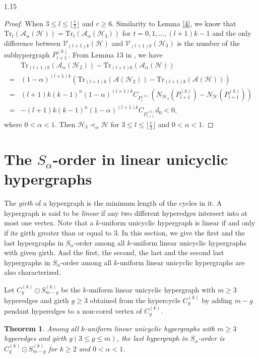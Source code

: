 \documentclass[preprint,12pt]{elsarticle1}
\newtheorem{thm}{Theorem}[section]
\numberwithin{equation}{section}
\begin{document}
\begin{spacing}{1.15}
\begin{proof}
When $3\le l\le \lfloor\frac{r}{2}\rfloor$ and $r\ge6$.
Similarity to Lemma \ref{4}, we know that $\mathrm{Tr}_t(\mathcal{A}_{\alpha}(\mathcal{H}))=\mathrm{Tr}_t(\mathcal{A}_{\alpha}(\mathcal{H}_3))$ for $t=0,1,\ldots,(l+1)k-1$ and the only difference between $\mathcal{V}_{(l+1)k}(\mathcal{H})$ and $\mathcal{V}_{(l+1)k}(\mathcal{H}_3)$ is the number of the subhypergraph $P_{l+1}^{(k)}$.
From Lemma 13 in \cite{ref10}, we have
\begin{align*}
&\mathrm{Tr}_{(l+1)k}(\mathcal{A}_{\alpha}(\mathcal{H}_2))-\mathrm{Tr}_{(l+1)k}(\mathcal{A}_{\alpha}(\mathcal{H}))\\
=&(1-\alpha)^{(l+1)k}\left(\mathrm{Tr}_{(l+1)k}(\mathcal{A}(\mathcal{H}_2))-\mathrm{Tr}_{(l+1)k}(\mathcal{A}(\mathcal{H}))\right)\\
=&(l+1)k(k-1)^{n}(1-\alpha)^{(l+1)k}C_{P_l^{(k)}}\left( N_{\mathcal{H}_3}(P_{l+1}^{(k)})-N_{\mathcal{H}}(P_{l+1}^{(k)}) \right)\\
=&-(l+1)k(k-1)^{n}(1-\alpha)^{(l+1)k}C_{P_{l+1}^{(k)}}d_0<0,
\end{align*}
where $0<\alpha<1$.
Then $\mathcal{H}_{3}\prec_{\alpha}\mathcal{H}$ for $3\le l\le \lfloor\frac{r}{2}\rfloor$ and $0<\alpha<1$.
\end{proof}



\section{The $S_{\alpha}$-order in linear unicyclic hypergraphs}
The \textit{girth} of a hypergraph is the minimum length of the cycles in it.
A hypergraph is said to be \textit{linear} if any two different hyperedges intersect into at most one vertex.
Note that a $k$-uniform unicyclic hypergraph is linear if and only if its girth greater than or equal to $3$.
In this section, we give the first and the last hypergraphs in $S_{\alpha}$-order among all $k$-uniform linear unicyclic hypergraphs with given girth.
And the first, the second, the last and the second last hypergraphs in $S_{\alpha}$-order among all $k$-uniform linear unicyclic hypergraphs are also characterized.

Let $C_{g}^{(k)}\odot S_{m-g}^{(k)}$ be the $k$-uniform linear unicyclic hypergraph with $m\ge3$ hyperedges and girth $g\ge3$ obtained from the hypercycle $C_g^{(k)}$ by adding $m-g$ pendant hyperedges to a non-cored vertex of $C_{g}^{(k)}$.

\begin{thm}\label{Ung}
Among all $k$-uniform linear unicyclic hypergraphs with $m\ge3$ hyperedges and girth $g(3\le g\le m)$, the last hypergraph in $S_{\alpha}$-order is $C_{g}^{(k)}\odot S_{m-g}^{(k)}$ for $k\ge2$ and $0<\alpha<1$.
\end{thm}


\end{spacing}
\end{document}
